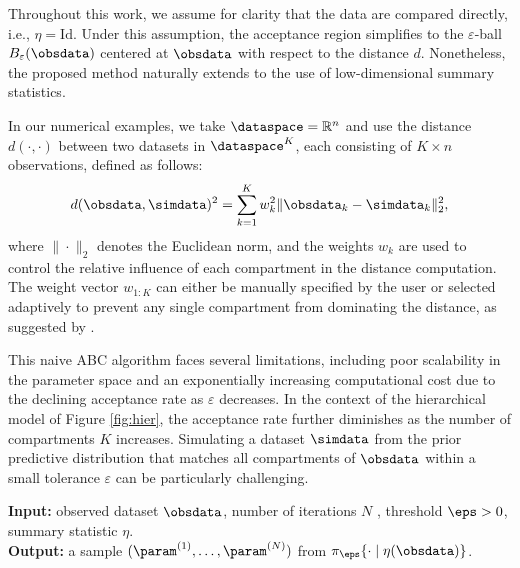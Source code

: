 Throughout this work, we assume for clarity that the data are compared directly, i.e., $\eta = \mathrm{Id}$. Under this assumption, the acceptance region simplifies to the $\varepsilon$-ball $B_{\varepsilon}(\obsdata)$ centered at $\obsdata$ with respect to the distance $d$. Nonetheless, the proposed method naturally extends to the use of low-dimensional summary statistics.


In our numerical examples, we take $\dataspace = \mathbb R^n$ and use the distance $d(\cdot,\cdot)$ between two datasets in \( \dataspace^K \), each consisting of \( K \times n \) observations, defined as follows: 
\begin{equation}
    \label{eqdistance}
    d(\obsdata, \simdata)^2 = {\sum_{k=1}^K w_k^2 \| \obsdata_k - \simdata_k \|_2^2},
\end{equation}
where \( \| \cdot \|_2 \) denotes the Euclidean norm, and the weights \( w_k \) are used to control the relative influence of each compartment in the distance computation. The weight vector \( w_{1:K} \) can either be manually specified by the user or selected adaptively to prevent any single compartment from dominating the distance, as suggested by \citet{prangle2017adapting}.


This naive ABC algorithm faces several limitations, including poor scalability in the parameter space and an exponentially increasing computational cost due to the declining acceptance rate as \( \varepsilon \) decreases. In the context of the hierarchical model of Figure \ref{fig:hier}, the acceptance rate further diminishes as the number of compartments \( K \) increases. Simulating a dataset \( \simdata \) from the prior predictive distribution that matches all compartments of \( \obsdata \) within a small tolerance \( \varepsilon \) can be particularly challenging. 



\begin{algorithm}
\label{alg:abc_vanilla}
\caption{Vanilla Approximate Bayesian Computation}
\textbf{Input: }observed dataset $\obsdata$, number of iterations $N$ , threshold $\eps>0$, summary statistic $\eta$.\\
\textbf{Output: }a sample $(\param^{(1)}, \dots, \param^{(N)})$ from $\pi_\eps\{\cdot\mid\eta(\obsdata)\}$.\\

\BlankLine

\end{algorithm}


